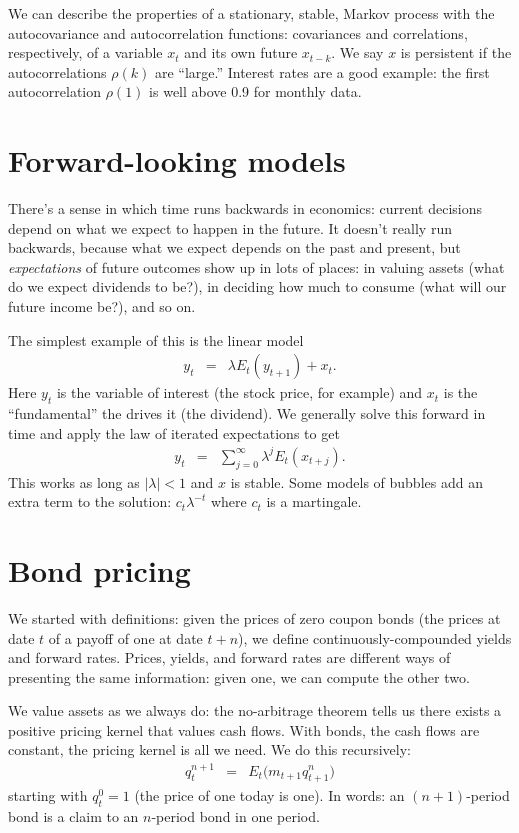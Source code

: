 \documentclass[11pt]{article}
\begin{document}
We can describe the properties of a stationary, stable, Markov process
with the autocovariance and autocorrelation functions:
covariances and correlations, respectively,
of a variable $x_t$ and its own future $x_{t-k} $.
We say $x$ is persistent if the autocorrelations $\rho(k)$ are ``large.''
Interest rates are a good example:
the first autocorrelation $\rho(1)$ is well above 0.9 for monthly data.



\section{Forward-looking models}

There's a sense in which time runs backwards in economics:
current decisions depend on what we expect to happen in the future.
It doesn't really run backwards, because what we expect depends on the past and present,
but {\it expectations\/} of future outcomes show up in lots of places:
in valuing assets (what do we expect dividends to be?),
in deciding how much to consume (what will our future income be?),
and so on.

The simplest example of this is the linear model
\begin{eqnarray*}
    y_t &=& \lambda E_t (y_{t+1}) + x_t .
\end{eqnarray*}
Here $y_t$ is the variable of interest (the stock price, for example)
and $x_t$ is the ``fundamental'' the drives it (the dividend).
We generally solve this forward in time and apply the law of iterated
expectations to get
\begin{eqnarray*}
    y_t &=& \sum_{j=0}^\infty \lambda^j E_t (x_{t+j}) .
\end{eqnarray*}
This works as long as $|\lambda | < 1$ and $x$ is stable.
Some models of bubbles add an extra term to the solution:
$ c_t \lambda^{-t}$ where $ c_t$ is a martingale.


\section{Bond pricing}

We started with definitions:  given the prices of zero coupon bonds
(the prices at date $t$ of a payoff of one at date $t+n$),
we define continuously-compounded yields and forward rates.
Prices, yields, and forward rates are different ways of presenting
the same information:  given one, we can compute the other two.

We value assets as we always do:  the no-arbitrage theorem
tells us there exists a positive pricing kernel that values cash flows.
With bonds, the cash flows are constant, the pricing kernel
is all we need.
We do this recursively:
\begin{eqnarray*}
    q^{n+1}_t &=& E_t \big( m_{t+1} q^n_{t+1} \big)
\end{eqnarray*}
starting with $q^0_t = 1$ (the price of one today is one).
In words:  an $(n+1)$-period bond is a claim to an $n$-period bond
in one period.
\end{document}
